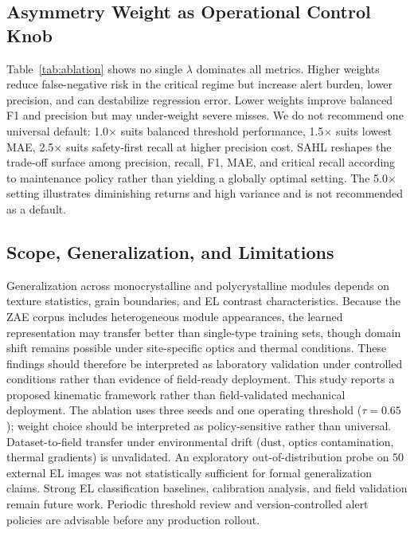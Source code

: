 \documentclass[journal]{IEEEtran}
\begin{document}
\subsection{Asymmetry Weight as Operational Control Knob}
Table~\ref{tab:ablation} shows no single $\lambda$ dominates all metrics. Higher weights reduce false-negative risk in the critical regime but increase alert burden, lower precision, and can destabilize regression error. Lower weights improve balanced F1 and precision but may under-weight severe misses. We do not recommend one universal default: 1.0$\times$ suits balanced threshold performance, 1.5$\times$ suits lowest MAE, 2.5$\times$ suits safety-first recall at higher precision cost. SAHL reshapes the trade-off surface among precision, recall, F1, MAE, and critical recall according to maintenance policy rather than yielding a globally optimal setting. The 5.0$\times$ setting illustrates diminishing returns and high variance and is not recommended as a default.

\subsection{Scope, Generalization, and Limitations}
Generalization across monocrystalline and polycrystalline modules depends on texture statistics, grain boundaries, and EL contrast characteristics. Because the ZAE corpus includes heterogeneous module appearances, the learned representation may transfer better than single-type training sets, though domain shift remains possible under site-specific optics and thermal conditions. These findings should therefore be interpreted as laboratory validation under controlled conditions rather than evidence of field-ready deployment. This study reports a proposed kinematic framework rather than field-validated mechanical deployment. The ablation uses three seeds and one operating threshold ($\tau=0.65$); weight choice should be interpreted as policy-sensitive rather than universal. Dataset-to-field transfer under environmental drift (dust, optics contamination, thermal gradients) is unvalidated. An exploratory out-of-distribution probe on 50 external EL images \cite{TheMakiran2026} was not statistically sufficient for formal generalization claims. Strong EL classification baselines, calibration analysis, and field validation remain future work. Periodic threshold review and version-controlled alert policies are advisable before any production rollout.
\end{document}
